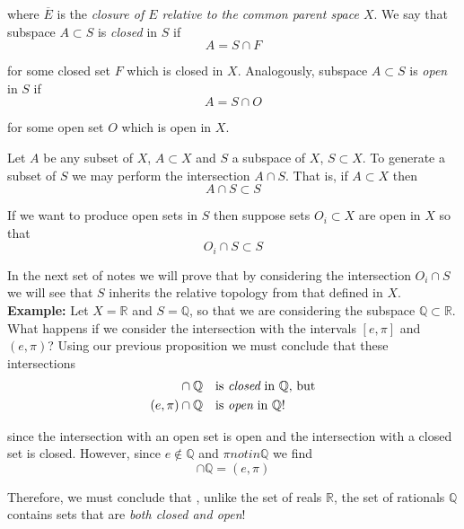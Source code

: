 \documentclass[12pt]{article}
\newlength\tindent
\renewcommand{\indent}{\hspace*{\tindent}}
\newcommand{\R}{\mathbb R}
\newcommand{\Q}{\mathbb Q}
\begin{document}
where $\overline{E}$ is the {\em closure of $E$ relative to the common parent space $X$}. We say that subspace $A \subset S$ is {\em closed} in $S$ if
\begin{equation*}
	A = S \cap F
\end{equation*}

for some closed set $F$ which is closed in $X$. Analogously, subspace $A \subset S$ is {\em open} in $S$ if
\begin{equation*}
	A = S \cap O
\end{equation*}

for some open set $O$ which is open in $X$.

Let $A$ be any subset of $X$, $A \subset X$ and $S$ a subspace of $X$, $S \subset X$. To generate a subset of $S$ we may perform the intersection $A \cap S$. That is, if $A \subset X$ then
\begin{equation*}
	A \cap S \subset S
\end{equation*}

If we want to produce open sets in $S$ then suppose sets $O_i \subset X$ are open in $X$ so that
\begin{equation*}
	O_i \cap S \subset S
\end{equation*}

\indent In the next set of notes we will prove that by considering the intersection $O_i \cap S$ we will see that $S$ inherits the relative topology from that defined in $X$. \\

%
%
{\bf Example:} Let $X = \R$ and $S = \Q$, so that we are considering the subspace $\Q \subset \R$. What happens if we consider the intersection with the intervals $[e, \pi]$ and $(e, \pi)$? Using our previous proposition we must conclude that these intersections 
\begin{align*}
	[e,\pi] &\cap \Q  \quad \text{is {\em closed} in $\Q$, but} \\
	(e, \pi) &\cap \Q \quad \text{is {\em open} in $\Q$!}
\end{align*}

since the intersection with an open set is open and the intersection with a closed set is closed. However, since $e \notin \Q$ and $\pi notin \Q$ we find
\begin{equation*}
	[e,\pi] \cap \Q = (e, \pi)
\end{equation*}

\indent Therefore, we must conclude that , unlike the set of reals $\R$, the set of rationals $\Q$ contains sets that are {\em both closed and open}!
\end{document}
